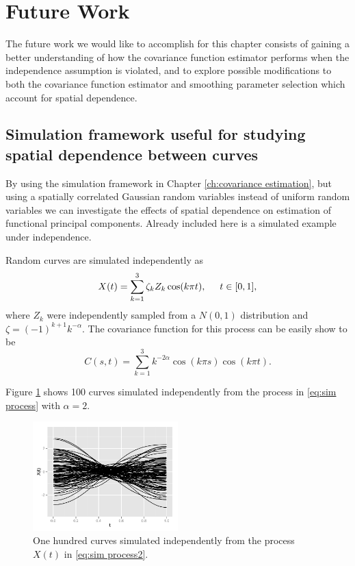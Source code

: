 %
\newpage
\section{Future Work}

The future work we would like to accomplish for this chapter consists of gaining a better understanding of how the covariance function estimator performs when the independence assumption is violated, and to explore possible modifications to both the covariance function estimator and smoothing parameter selection which account for spatial dependence. 

\subsection{Simulation framework useful for studying spatial dependence between curves}
By using the simulation framework in Chapter \ref{ch:covariance estimation}, but using a spatially correlated Gaussian random variables instead of uniform random variables we can investigate the effects of spatial dependence on estimation of functional principal components. Already included here is a simulated example under independence. 

Random curves are simulated independently as
\begin{equation}
X(t) = \sum^{3}_{k=1}\zeta_k Z_k \cos(k\pi t), \hspace{0.5cm} t \in [0,1],
\label{eq:sim process2}
\end{equation}
where $Z_k$ were independently sampled from a $N(0,1)$ distribution and \(\zeta=(-1)^{k+1}k^{-\alpha}\). 
The covariance function for this process can be easily show to be
\begin{equation}
C(s,t) = \sum^{3}_{k=1}k^{-2\alpha} \cos(k\pi s)\cos(k\pi t). 
\end{equation}

Figure \ref{fig:sim curves2} shows 100 curves simulated independently from the process in \eqref{eq:sim process} with $\alpha=2$. 


\begin{figure}
\begin{center}
\includegraphics[width=0.5\textwidth]{images/Ch3/sim-curves.pdf}
\end{center}
\caption{One hundred curves simulated independently from the process $X(t)$ in \eqref{eq:sim process2}.}
\label{fig:sim curves2}
\end{figure}


